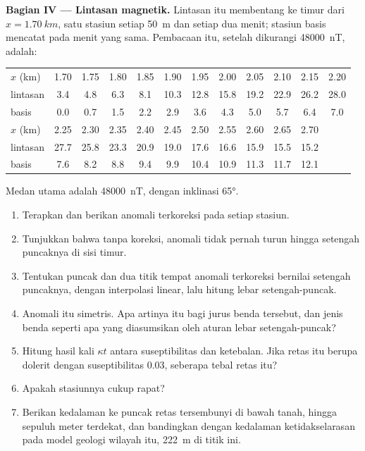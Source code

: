 \begin{problem}
\medskip\noindent\textbf{Bagian IV --- Lintasan magnetik.} Lintasan itu membentang
ke timur dari $x = \qty{1.70}{km}$, satu stasiun setiap \qty{50}{m} dan setiap
dua menit; stasiun basis mencatat pada menit yang sama. Pembacaan
itu, setelah dikurangi \qty{48000}{nT}, adalah:
\begin{center}
\small
\setlength{\tabcolsep}{3.5pt}
\begin{tabular}{lccccccccccc}
\hline
$x$ (km) & 1.70 & 1.75 & 1.80 & 1.85 & 1.90 & 1.95 & 2.00 & 2.05 & 2.10 & 2.15 & 2.20 \\
lintasan & 3.4 & 4.8 & 6.3 & 8.1 & 10.3 & 12.8 & 15.8 & 19.2 & 22.9 & 26.2 & 28.0 \\
basis & 0.0 & 0.7 & 1.5 & 2.2 & 2.9 & 3.6 & 4.3 & 5.0 & 5.7 & 6.4 & 7.0 \\
\hline
$x$ (km) & 2.25 & 2.30 & 2.35 & 2.40 & 2.45 & 2.50 & 2.55 & 2.60 & 2.65 & 2.70 & \\
lintasan & 27.7 & 25.8 & 23.3 & 20.9 & 19.0 & 17.6 & 16.6 & 15.9 & 15.5 & 15.2 & \\
basis & 7.6 & 8.2 & 8.8 & 9.4 & 9.9 & 10.4 & 10.9 & 11.3 & 11.7 & 12.1 & \\
\hline
\end{tabular}
\end{center}
Medan utama adalah \qty{48000}{nT}, dengan inklinasi \ang{65}.
\begin{enumerate}[resume]
\item Terapkan  dan berikan anomali terkoreksi pada
  setiap stasiun.
\item Tunjukkan bahwa tanpa koreksi, anomali tidak pernah turun hingga setengah
  puncaknya di sisi timur.
\item Tentukan puncak dan dua titik tempat anomali terkoreksi bernilai setengah
  puncaknya, dengan interpolasi linear, lalu hitung lebar setengah-puncak.
\item Anomali itu simetris. Apa artinya itu bagi jurus
  benda tersebut, dan jenis benda seperti apa yang diasumsikan oleh aturan lebar setengah-puncak?
\item Hitung hasil kali $\kappa t$ antara suseptibilitas dan ketebalan.
  Jika retas itu berupa dolerit dengan suseptibilitas \num{0.03}, seberapa tebal
  retas itu?
\item Apakah stasiunnya cukup rapat?
\item Berikan kedalaman ke puncak retas tersembunyi di bawah tanah, hingga
  sepuluh meter terdekat, dan bandingkan dengan kedalaman ketidakselarasan
  pada model geologi wilayah itu, \qty{222}{m} di
  titik ini.
\end{enumerate}
\end{problem}
